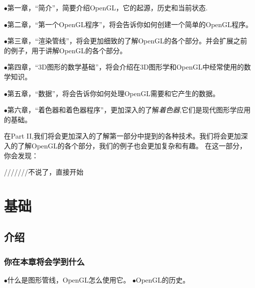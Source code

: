 \documentclass{book}
\begin{document}
\begin{CJK}{UTF8}{gbsn}
\(\bullet\)第一章，“简介”，简要介绍OpenGL，它的起源，历史和当前状态.

\(\bullet\)第二章，“第一个OpenGL程序”，将会告诉你如何创建一个简单的OpenGL程序。

\(\bullet\)第三章，“渲染管线”，将会更加细致的了解OpenGL的各个部分。并会扩展之前的例子，用于讲解OpenGL的各个部分。

\(\bullet\)第四章，“3D图形的数学基础”，将会介绍在3D图形学和OpenGL中经常使用的数学知识。

\(\bullet\)第五章，“数据”，将会告诉你如何处理OpenGL需要和它产生的数据。

\(\bullet\)第六章，“着色器和着色器程序”，更加深入的了解\emph{着色器},它们是现代图形学应用的基础。

在Part II,我们将会更加深入的了解第一部分中提到的各种技术。我们将会更加深入的了解OpenGL的各个部分，我们的例子也会更加复杂和有趣。
在这一部分，你会发现：


///////不说了，直接开始

\part{基础}

\chapter{介绍}
\section{你在本章将会学到什么}
\(\bullet\)什么是图形管线，OpenGL怎么使用它。
\(\bullet\)OpenGL的历史。

\end{CJK}
\end{document}
